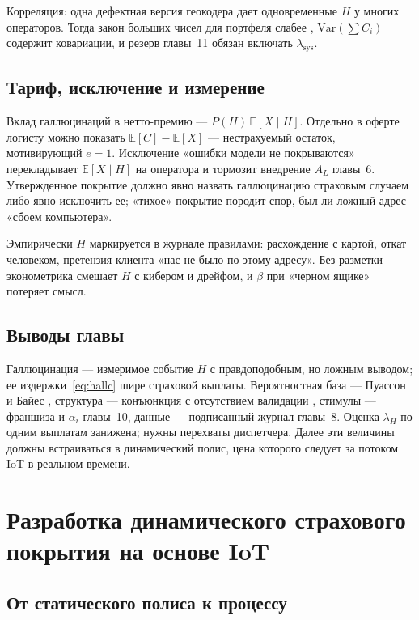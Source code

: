\documentclass[a4paper,14pt]{extarticle}
\begin{document}
Корреляция: одна дефектная версия геокодера дает одновременные $H$ у многих операторов. Тогда закон больших чисел для портфеля слабее \cite{shvedov}, $\mathrm{Var}(\sum C_i)$ содержит ковариации, и резерв главы~11 обязан включать $\lambda_{\mathrm{sys}}$.

\subsection{Тариф, исключение и измерение}

Вклад галлюцинаций в нетто-премию --- $P(H)\,\mathbb{E}[X\mid H]$. Отдельно в оферте логисту можно показать $\mathbb{E}[C]-\mathbb{E}[X]$ --- нестрахуемый остаток, мотивирующий $e=1$. Исключение «ошибки модели не покрываются» перекладывает $\mathbb{E}[X\mid H]$ на оператора и тормозит внедрение $A_L$ главы~6. Утвержденное покрытие \cite{zezina} должно явно назвать галлюцинацию страховым случаем либо явно исключить ее; «тихое» покрытие породит спор, был ли ложный адрес «сбоем компьютера».

Эмпирически $H$ маркируется в журнале правилами: расхождение с картой, откат человеком, претензия клиента «нас не было по этому адресу». Без разметки эконометрика смешает $H$ с кибером и дрейфом, и $\beta$ при «черном ящике» потеряет смысл.

\subsection{Выводы главы}

Галлюцинация --- измеримое событие $H$ с правдоподобным, но ложным выводом; ее издержки~\eqref{eq:hallc} шире страховой выплаты. Вероятностная база --- Пуассон и Байес \cite{shvedov}, структура --- конъюнкция с отсутствием валидации \cite{yablonsky}, стимулы --- франшиза и $\alpha_i$ главы~10, данные --- подписанный журнал главы~8. Оценка $\lambda_H$ по одним выплатам занижена; нужны перехваты диспетчера. Далее эти величины должны встраиваться в динамический полис, цена которого следует за потоком IoT в реальном времени.


\section{Разработка динамического страхового покрытия на основе IoT}

\subsection{От статического полиса к процессу}
\end{document}
